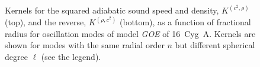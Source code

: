 \begin{figure}
    \centering%
    \\%
    \caption[$(c^2,\rho)$ kernels for 16~Cyg~A]{Kernels for the squared adiabatic sound speed and density, $K^{(c^2, \rho)}$ (top), and the reverse, $K^{(\rho, c^2)}$ (bottom), as a function of fractional radius for oscillation modes of model \emph{GOE} of 16~Cyg~A. Kernels are shown for modes with the same radial order $n$ but different spherical degree $\ell$ (see the legend). 
    \label{fig:c2-rho} }
\end{figure}


